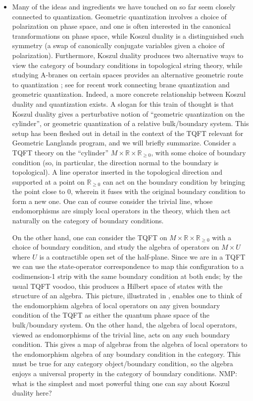 \documentclass[11pt]{amsart}
\def\natalie#1{{\textcolor{green!65!black}{NMP: {#1}}}}
\begin{document}
\begin{itemize}
\item Many of the ideas and ingredients we have touched on so far seem closely connected to quantization. Geometric quantization involves a choice of polarization on phase space, and one is often interested in the canonical transformations on phase space, while Koszul duality is a distinguished such symmetry (a swap of canonically conjugate variables given a choice of polarization). Furthermore, Koszul duality produces two alternative ways to view the category of boundary conditions in topological string theory, while studying A-branes on certain spaces provides an alternative geometric route to quantization \cite{GukovWitten}; see \cite{GW} for recent work connecting brane quantization and geometric quantization.  Indeed, a more concrete relationship between Koszul duality and quantization exists. A slogan for this train of thought is that Koszul duality gives a perturbative notion of ``geometric quantization on the cylinder'', or geometric quantization of a relative bulk/boundary system. This setup has been fleshed out in detail \cite{EY} in the context of the TQFT relevant for Geometric Langlands program, and we will briefly summarize. Consider a TQFT theory on the ``cylinder'' $M \times \mathbb{R} \times \mathbb{R}_{\geq 0}$, with some choice of boundary condition (so, in particular, the direction normal to the boundary is topological). A line operator inserted in the topological direction and supported at a point on $\mathbb{R}_{\geq 0}$ can act on the boundary condition by bringing the point close to 0, wherein it fuses with the original boundary condition to form a new one. One can of course consider the trivial line, whose endomorphisms are simply local operators in the theory, which then act naturally on the category of boundary conditions. 

On the other hand, one can consider the TQFT on $M \times \mathbb{R} \times \mathbb{R}_{\geq 0}$ with a choice of boundary condition, and study the algebra of operators on $M \times U$ where $U$ is a contractible open set of the half-plane. Since we are in a TQFT we can use the state-operator correspondence to map this configuration to a codimension-1 strip with the same boundary condition at both ends; by the usual TQFT voodoo, this produces a Hilbert space of states with the structure of an algebra. This picture, illustrated in \cite{EY}, enables one to think of the endomorphism algebra of local operators on any given boundary condition of the TQFT as either the quantum phase space of the bulk/boundary system. On the other hand, the algebra of local operators, viewed as endomorphisms of the trivial line, acts on any such boundary condition. This gives a map of algebras from the algebra of local operators to the endomorphism algebra of any boundary condition in the category. This must be true for any category object/boundary condition, so the algebra enjoys a universal property in the category of boundary conditions. \natalie{what is the simplest and most powerful thing one can say about Koszul duality here?}



\end{itemize}
\end{document}
